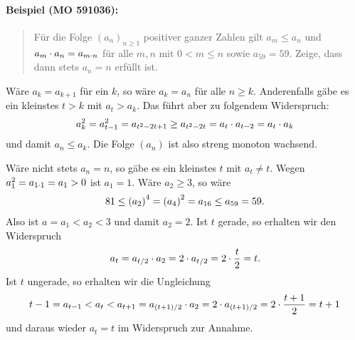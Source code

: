 \documentclass[11pt,a4paper]{article}
\newcommand{\nein}[1]{}
\begin{document}
\paragraph{Beispiel (MO 591036):}
\begin{quote}
  Für die Folge $(a_n)_{n\ge 1}$ positiver ganzer Zahlen gilt $a_m\le a_n$ und
  $a_m\cdot a_n=a_{m\cdot n}$ für alle $m,n$ mit $0<m\le n$ sowie $a_{59}=59$.
  Zeige, dass dann stets $a_n=n$ erfüllt ist.
\end{quote}
\begin{loesung}
  Wäre $a_k=a_{k+1}$ für ein $k$, so wäre $a_k=a_n$ für alle $n\ge k$.
  Anderenfalls gäbe es ein kleinstes $t>k$ mit $a_t>a_k$. Das führt aber zu
  folgendem Widerspruch:
  \begin{gather*}
    a_k^2=a_{t-1}^2=a_{t^2-2t+1}\ge a_{t^2-2t}=a_t\cdot a_{t-2}=a_t\cdot a_k
  \end{gather*}
  und damit $a_n\le a_k$.  Die Folge $(a_n)$ ist also streng monoton wachsend.

  Wäre nicht stets $a_n=n$, so gäbe es ein kleinstes $t$ mit $a_t\neq t$.
  Wegen $a_1^2=a_{1\cdot 1}=a_1>0$ ist $a_1=1$. Wäre $a_2\ge 3$, so wäre 
  \begin{gather*}
    81\le \left(a_2\right)^4=\left(a_4\right)^2=a_{16}\le a_{59}=59.
  \end{gather*}
  Also ist $a=a_1<a_2<3$ und damit $a_2=2$.  Ist $t$ gerade, so erhalten wir
  den Widerspruch
  \begin{gather*}
    a_t=a_{t/2}\cdot a_2=2\cdot a_{t/2}=2\cdot \frac{t}{2}=t.
  \end{gather*}
  Ist $t$ ungerade, so erhalten wir die Ungleichung
  \begin{gather*}
    t-1=a_{t-1}<a_t<a_{t+1}=a_{(t+1)/2}\cdot a_2=2\cdot a_{(t+1)/2}=2\cdot
    \frac{t+1}{2}=t+1
  \end{gather*}
  und daraus wieder $a_t=t$ im Widerspruch zur Annahme.   
\end{loesung}

\nein{
\paragraph{Wurzel, Okt. 1990:}
\begin{quote}
  $a_0,\dots, a_n$ sei eine Folge nichtnegativer ganzer Zahlen mit $a_0=0$ und
  $\abs{a_i-a_{i+1}}=1, i=0,\dots,n-1$.

  Zeige, dass es genau $\binom{n}{\floor{\frac{n}{2}}}$ solcher Folgen gibt.
\end{quote}
\begin{loesung}
  Stellt man die entsprechenden Pfade bis zu $a_k=i$ ($k+1$ ist immer gerade)
  dar, so ergibt sich ein „halbes“ Pascalsches Dreieck
  
  Setze $f(k,i)$ gleich Zahl der Folgen bis $a_k=i$, dann ergibt sich die
  Rekursion $f(k,i)=f(k-1,i+1)+f(k-1,i-1)$, wobei $f(0,0)=1$ und $f(k,i)=0$
  für $i<0$ oder $i>k$ gesetzt wird. Weiter?  
\end{loesung}
}
\end{document}
